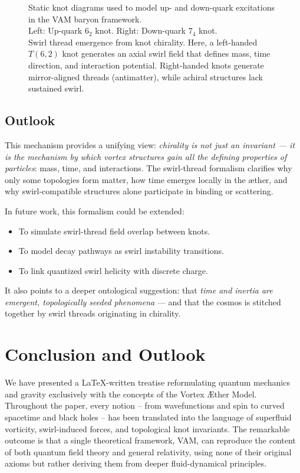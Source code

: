\documentclass[preprint]{revtex4-2}
\begin{document}
\begin{figure}[H]
\begin{minipage}{0.25\textwidth}
        \end{minipage}
        \caption{Static knot diagrams used to model up- and down-quark excitations in the VAM baryon framework.\\
        Left: Up-quark \(6_2\) knot. Right: Down-quark \(7_4\) knot.\\
        Swirl thread emergence from knot chirality. Here, a left-handed $T(6,2)$ knot generates an axial swirl field that defines mass, time direction, and interaction potential. Right-handed knots generate mirror-aligned threads (antimatter), while achiral structures lack sustained swirl.}
        \label{fig:chiralsummary}
    \end{figure}



    \subsection*{Outlook}

    This mechanism provides a unifying view: \textit{chirality is not just an invariant — it is the mechanism by which vortex structures gain all the defining properties of particles}: mass, time, and interactions. The swirl-thread formalism clarifies why only some topologies form matter, how time emerges locally in the æther, and why swirl-compatible structures alone participate in binding or scattering.

    In future work, this formalism could be extended:
    \begin{itemize}
        \item To simulate swirl-thread field overlap between knots.
        \item To model decay pathways as swirl instability transitions.
        \item To link quantized swirl helicity with discrete charge.
    \end{itemize}

    It also points to a deeper ontological suggestion: that \textit{time and inertia are emergent, topologically seeded phenomena} — and that the cosmos is stitched together by swirl threads originating in chirality.


\section{Conclusion and Outlook}
    We have presented a LaTeX-written treatise reformulating quantum mechanics and gravity exclusively with the concepts of the Vortex Æther Model. Throughout the paper, every notion – from wavefunctions and spin to curved spacetime and black holes – has been translated into the language of superfluid vorticity, swirl-induced forces, and topological knot invariants. The remarkable outcome is that a single theoretical framework, VAM, can reproduce the content of both quantum field theory and general relativity, using none of their original axioms but rather deriving them from deeper fluid-dynamical principles.
\end{document}
